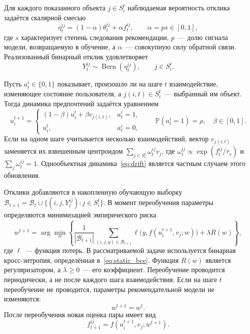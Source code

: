 Для каждого показанного объекта $j\in S_i^t$ наблюдаемая вероятность отклика
задаётся скалярной смесью
\begin{equation}
    \eta_t^{ij}
    =(1-\alpha)\theta_t^{ij}+\alpha f_t^{ij},
    \qquad \alpha=ps\in[0,1],
    \label{eq:contaminated}
\end{equation}
где $s$ характеризует степень следования рекомендации, $p$~--- долю сигнала
модели, возвращаемую в обучение, а $\alpha$~--- совокупную силу обратной связи.
Реализованный бинарный отклик удовлетворяет
\begin{equation}
    Y_t^{ij}\sim\operatorname{Bern}(\eta_t^{ij}),
    \qquad j\in S_i^t.
    \label{eq:observed_response}
\end{equation}

Пусть $a_t^i\in\{0,1\}$ показывает, произошло ли на шаге $t$ взаимодействие,
изменяющее состояние пользователя, а $j(i,t)\in S_i^t$~--- выбранный им объект.
Тогда динамика предпочтений задаётся уравнением
\begin{equation}
    u_i^{t+1} =
    \begin{cases}
        (1-\beta)u_i^t+\beta v_{j(i,t)}, & a_t^i=1,\\
        u_i^t, & a_t^i=0,
    \end{cases}
    \qquad
    \mathbb P(a_t^i=1)=\rho,\quad \beta\in[0,1].
    \label{eq:drift}
\end{equation}
Если на одном шаге учитывается несколько взаимодействий, вектор
$v_{j(i,t)}$ заменяется их взвешенным центроидом
$\sum_{j\in S_i^t}\omega_t^{ij}v_j$, где
$\omega_t^{ij}\propto\exp(f_t^{ij}/\tau_s)$ и
$\sum_j\omega_t^{ij}=1$. Однообъектная динамика~\eqref{eq:drift} является
частным случаем этого обновления.

Отклики добавляются в накопленную обучающую выборку
$\mathcal B_{t+1}=\mathcal B_t\cup
\{(i,j,Y_t^{ij}):j\in S_i^t\}$. В момент переобучения параметры определяются
минимизацией эмпирического риска
\begin{equation}
    w^{t+1}
    =\arg\min_{w}\left\{
    \frac{1}{|\mathcal B_{t+1}|}
    \sum_{(i,j,y)\in\mathcal B_{t+1}}
    \ell\bigl(y,f(u_i^{t+1},v_j;w)\bigr)
    +\lambda R(w)\right\},
    \label{eq:argmin}
\end{equation}
где $\ell$~--- функция потерь. В рассматриваемой задаче используется
бинарная кросс-энтропия, определённая в~\eqref{eq:static_bce}. Функция
$R(w)$ является регуляризатором, а $\lambda\ge0$~--- его коэффициент. Переобучение
проводится периодически, а не после каждого шага взаимодействия. Если на шаге
$t$ переобучение не проводится, параметры рекомендательной модели не изменяются:
\[
    w^{t+1}=w^t.
\]
После переобучения новая оценка пары имеет вид
\[
    f_{t+1}^{ij}=f(u_i^{t+1},v_j;w^{t+1}).
\]

